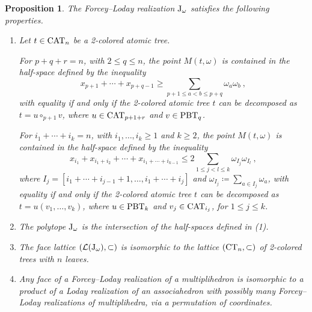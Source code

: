 \documentclass[10pt]{amsart}
\newtheorem{proposition}[definition]{Proposition}
\theoremstyle{remark}
\begin{document}
\begin{proposition}\label{prop:PropertiesKLoday}
The Forcey--Loday realization $\mathrm{J}_\omega$  satisfies the following properties. 
\begin{enumerate}[leftmargin=*]
\item Let $t\in \mathrm{CAT}_{n}$ be a 2-colored atomic tree. 

\noindent For $p+q+r=n$, with $2\leq q\leq n$, the point $M(t, \omega)$ is contained in the half-space defined by the inequality
\begin{equation}\label{Eq:B}\tag{$\B$}
x_{p+1}+\cdots+x_{p+q-1}\geq \sum_{p+1\leq a<b\leq p+q} \omega_a \omega_b\ , 
\end{equation}
with equality if and only if the 2-colored atomic tree $t$ can be decomposed as $t=u\circ_{p+1} v$, where $u\in\mathrm{CAT}_{p+1+r}$ and $v\in \mathrm{PBT}_{q}$. 

\noindent For $i_1+\cdots+i_k=n$, with $i_1, \ldots,i_k\geq 1$ and $k\geq 2$, the point $M(t, \omega)$ is contained in the half-space defined by the inequality
\begin{equation}\label{Eq:T}\tag{$\T$}
x_{i_1}+x_{i_1+i_2}+\cdots+x_{i_1+\cdots+i_{k-1}}\leq 
2\sum_{1\leq j<l\leq k} \omega_{I_j} \omega_{I_l}\ , 
\end{equation}
where $I_j=[i_1+\cdots +i_{j-1}+1, \ldots, i_1+\cdots +i_j]$ and $\omega_{I_j}\coloneqq\sum_{a\in I_j} \omega_a$, with equality if and only if the 2-colored atomic tree $t$ can be decomposed as $t=u(v_1, \ldots, v_k)$, where $u\in\mathrm{PBT}_{k}$ and $v_j\in \mathrm{CAT}_{i_j}$, for $1\leq j\leq k$. 


\item The polytope $\mathrm{J}_\omega$ is the intersection of the half-spaces defined in  \emph{(1)}. 

\item The face lattice $(\mathcal{L}(\mathrm{J}_\omega), \subset)$ is isomorphic to the lattice $(\mathrm{CT}_{n}, \subset)$ of 2-colored trees with $n$ leaves.

\item Any face of a Forcey--Loday realization of a multiplihedron is isomorphic to a product of a Loday realization of an associahedron with possibly many Forcey--Loday realizations of multiplihedra, via a permutation of coordinates. 
\end{enumerate}
\end{proposition}
\end{document}
